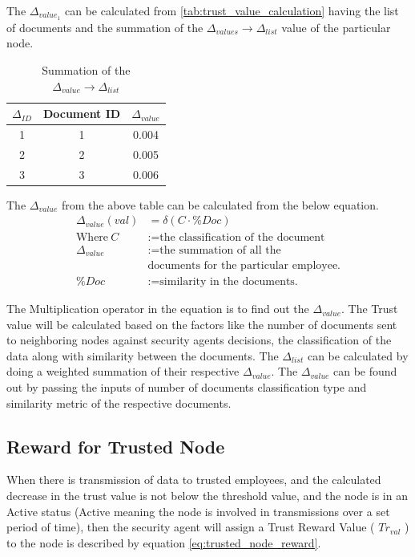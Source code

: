 The \(\Delta_{value_1}\) can be calculated from \ref{tab:trust_value_calculation} having the list of
documents and the summation of the \(\Delta_{values} \to \Delta_{list} \) value of the particular node. 

\begin{table}[h!]
    \centering
    \begin{tabular}{c | c | c}
        \hline
        \(\Delta_{ID} \) & Document ID & \(\Delta_{value}\) \\
        \hline \hline
        1 & 1 & 0.004 \\
        2 & 2 & 0.005 \\
        3 & 3 & 0.006 \\
    \end{tabular}
    \caption{Summation of the \(\Delta_{value} \to \Delta_{list}\)}
    \label{tab:summation_value_calculation}
\end{table}

The \(\Delta_{value}\) from the above table can be calculated from the below equation.
\begin{equation}
    \begin{aligned}
    \Delta_{value}(val) &= \delta(C \cdot \%Doc) \\
    \text{Where}~C &:= \text{the classification of the document} \\
    \Delta_{value} &:= \text{the summation of all the} \\
    &\text{documents for the particular employee.}\\ 
    \%Doc &:= \text{similarity in the documents.}
\end{aligned}
\end{equation}

The Multiplication operator in the equation is to find out the \( \Delta_{value} \).
The Trust value will be calculated based on the factors like the number of
documents sent to neighboring nodes against security agents decisions, the
classification of the data along with similarity between the documents. The \(
\Delta_{list} \) can be calculated by doing a weighted summation of their respective \( \Delta_{value} \). The \( \Delta_{value} \) can be found out by passing the inputs of number of documents classification type and  similarity metric of the respective documents.

\subsection{Reward for Trusted Node}
When there is transmission of data to trusted employees, and the calculated
decrease in the trust value is not below the threshold value, and the node is in
an Active status (Active meaning the node is involved in transmissions over
a set period of time), then the security agent will assign a Trust Reward Value
( \( Tr_{val} \) ) to the node is described by equation \ref{eq:trusted_node_reward}. 

